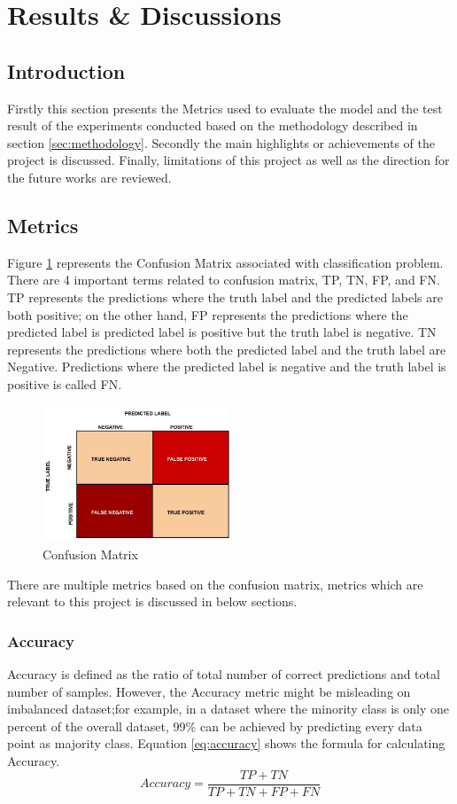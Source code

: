 \documentclass[twoside,11pt,a4paper]{article}
\begin{document}
\section{Results \& Discussions}\label{sec:results_discussions}

\subsection{Introduction}
Firstly this section presents the Metrics used to evaluate the model and the test result of the experiments conducted based on the methodology described in section \ref{sec:methodology}. Secondly the main highlights or achievements of the project is discussed. Finally, limitations of this project as well as the direction for the future works are reviewed.
\subsection{Metrics}
Figure \ref{fig:confusion_matrix} represents the Confusion Matrix associated with classification problem. There are 4 important terms related to confusion matrix, \acf{TP}, \acf{TN}, \acf{FP}, and \acf{FN}. \acs{TP} represents the predictions where the truth label and the predicted labels are both positive; on the other hand, \acs{FP} represents the predictions where the predicted label is predicted label is positive but the truth label is negative. \acs{TN} represents the predictions where both the predicted label and the truth label are Negative. Predictions where the predicted label is negative and the truth label is positive is called \acs{FN}.
\begin{figure}[ht]
	\centering
	\includegraphics[width=0.5\textwidth]{confusion_matrix}
	\caption[Confusion Matrix]{Confusion Matrix \citep{confusion_matrix}}
	\label{fig:confusion_matrix}
\end{figure}
There are multiple metrics based on the confusion matrix, metrics which are relevant to this project is discussed in below sections.
\subsubsection{Accuracy}
Accuracy is defined as the ratio of total number of correct predictions and total number of samples. However, the Accuracy metric might be misleading on imbalanced dataset;for example, in a dataset where the minority class is only one percent of the overall dataset, 99\% can be achieved by predicting every data point as majority class. Equation \ref{eq:accuracy} shows the formula for calculating Accuracy.
\begin{equation} \label{eq:accuracy}
	Accuracy = \frac{TP+TN}{TP+TN+FP+FN}
\end{equation}
\end{document}
